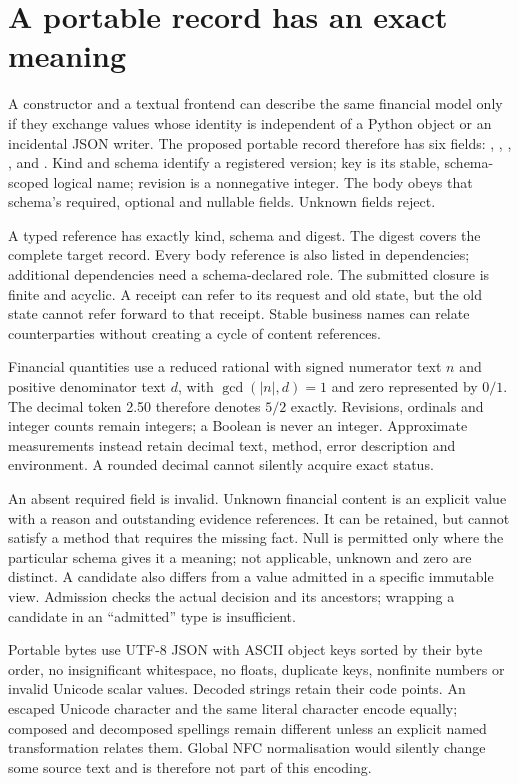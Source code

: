 \section{A portable record has an exact meaning}
\label{sec:portable-record}

A constructor and a textual frontend can describe the same financial model
only if they exchange values whose identity is independent of a Python object
or an incidental JSON writer. The proposed portable record therefore has six
fields: , , , ,  and
. Kind and schema identify a registered version; key is its
stable, schema-scoped logical name; revision is a nonnegative integer. The body obeys that
schema's required, optional and nullable fields. Unknown fields reject.

A typed reference has exactly kind, schema and digest. The digest covers the
complete target record. Every body reference is also listed in dependencies;
additional dependencies need a schema-declared role. The submitted closure is
finite and acyclic. A receipt can refer to its request and old state, but the
old state cannot refer forward to that receipt. Stable business names can
relate counterparties without creating a cycle of content references.

Financial quantities use a reduced rational with signed numerator text $n$ and
positive denominator text $d$, with $\gcd(|n|,d)=1$ and zero represented by
$0/1$. The decimal token 2.50 therefore denotes $5/2$ exactly. Revisions,
ordinals and integer counts remain integers; a Boolean is never an integer.
Approximate measurements instead retain decimal text, method, error description
and environment. A rounded decimal cannot silently acquire exact status.

An absent required field is invalid. Unknown financial content is an explicit
value with a reason and outstanding evidence references. It can be retained,
but cannot satisfy a method that requires the missing fact. Null is permitted
only where the particular schema gives it a meaning; not applicable, unknown
and zero are distinct. A candidate also differs from a value admitted in a
specific immutable view. Admission checks the actual decision and its ancestors;
wrapping a candidate in an ``admitted'' type is insufficient.

Portable bytes use UTF-8 JSON with ASCII object keys sorted by their byte order,
no insignificant whitespace, no floats, duplicate keys, nonfinite numbers or
invalid Unicode scalar values. Decoded strings retain their code points.
An escaped Unicode character and the same literal character encode equally;
composed and decomposed spellings remain different unless an explicit named
transformation relates them. Global NFC normalisation would silently change
some source text and is therefore not part of this encoding.

